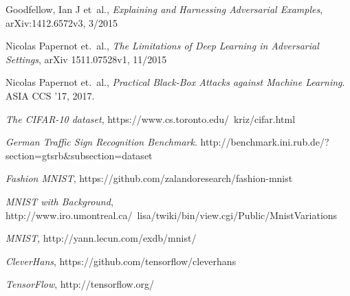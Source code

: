 \documentclass{article}
\begin{document}
\begin{thebibliography}{9}
\raggedright
{}
    Goodfellow, Ian J et\ al.,
    \emph{Explaining and Harnessing Adversarial Examples},	
    arXiv:1412.6572v3,
    3/2015

    Nicolas Papernot et.\ al.,
   \emph{The Limitations of Deep Learning in Adversarial Settings},
    arXiv 1511.07528v1,
    11/2015

    Nicolas Papernot et.\ al.,
    \emph{Practical Black-Box Attacks against Machine Learning}.
    ASIA CCS '17,
    2017.

    \emph{The CIFAR-10 dataset},
    https://www.cs.toronto.edu/~kriz/cifar.html

    \emph{German Traffic Sign Recognition Benchmark}.
    http://benchmark.ini.rub.de/?section=gtsrb\&subsection=dataset

    \emph{Fashion MNIST},
    https://github.com/zalandoresearch/fashion-mnist

    \emph{MNIST with Background},
    http://www.iro.umontreal.ca/~lisa/twiki/bin/view.cgi/Public/MnistVariations

    \emph{MNIST},
    http://yann.lecun.com/exdb/mnist/

    \emph{CleverHans},
    https://github.com/tensorflow/cleverhans

    \emph{TensorFlow},
    http://tensorflow.org/

\end{thebibliography}
\end{document}
